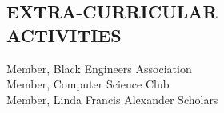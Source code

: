 \documentclass[line, margin, 10pt]{res} %
\begin{document}
\begin{resume}
\section{EXTRA-CURRICULAR \\ ACTIVITIES} 

Member, Black Engineers Association \\
Member, Computer Science Club \\
Member, Linda Francis Alexander Scholars \\
 


\end{resume}
\end{document}
